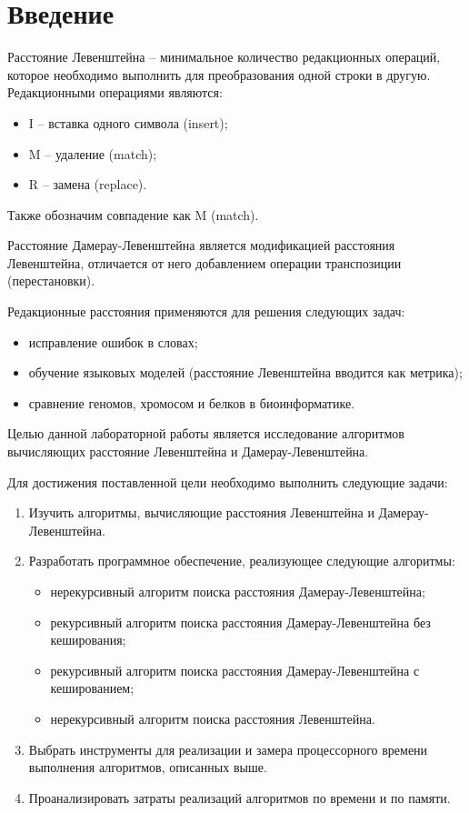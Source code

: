 \chapter*{Введение}


Расстояние Левенштейна -- минимальное количество редакционных операций, которое необходимо выполнить для преобразования одной строки в другую. Редакционными операциями являются: 
\begin{itemize}
	\item I -- вставка одного символа (insert);
	\item M -- удаление (match);
	\item R -- замена (replace).
\end{itemize}
Также обозначим совпадение как M (match).

Расстояние Дамерау-Левенштейна является модификацией расстояния Левенштейна, отличается от него добавлением операции транспозиции (перестановки).  

Редакционные расстояния применяются для решения следующих задач:
\begin{itemize}
	\item исправление ошибок в словах;
	\item обучение языковых моделей (расстояние Левенштейна вводится как метрика);
	\item сравнение геномов, хромосом и белков в биоинформатике.
\end{itemize}

Целью данной лабораторной работы является исследование алгоритмов вычисляющих расстояние Левенштейна и Дамерау-Левенштейна.

Для достижения поставленной цели необходимо выполнить следующие задачи:
\begin{enumerate}
	\item Изучить алгоритмы, вычисляющие расстояния Левенштейна и Дамерау-Левенштейна.
	\item Разработать программное обеспечение, реализующее следующие алгоритмы:
	\begin{itemize}
		\item нерекурсивный алгоритм поиска расстояния Дамерау-Левенштейна;
		\item рекурсивный алгоритм поиска расстояния Дамерау-Левенштейна без кеширования;
		\item рекурсивный алгоритм поиска расстояния Дамерау-Левенштейна с кешированием;
		\item нерекурсивный алгоритм поиска расстояния Левенштейна.
	\end{itemize}
	\item Выбрать инструменты для реализации и замера процессорного времени выполнения алгоритмов, описанных выше.
	\item Проанализировать затраты реализаций алгоритмов по времени и по памяти.
\end{enumerate}
